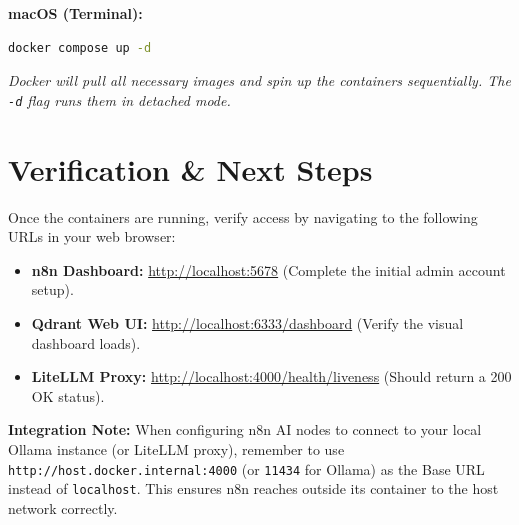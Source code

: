 \documentclass[12pt,a4paper]{article}
\begin{document}
\textbf{macOS (Terminal):}
\begin{lstlisting}[language=bash]
docker compose up -d
\end{lstlisting}
\textit{Docker will pull all necessary images and spin up the containers sequentially. The \texttt{-d} flag runs them in detached mode.}

\section{Verification \& Next Steps}
Once the containers are running, verify access by navigating to the following URLs in your web browser:
\begin{itemize}
    \item \textbf{n8n Dashboard:} \url{http://localhost:5678} (Complete the initial admin account setup).
    \item \textbf{Qdrant Web UI:} \url{http://localhost:6333/dashboard} (Verify the visual dashboard loads).
    \item \textbf{LiteLLM Proxy:} \url{http://localhost:4000/health/liveness} (Should return a 200 OK status).
\end{itemize}

\textbf{Integration Note:} When configuring n8n AI nodes to connect to your local Ollama instance (or LiteLLM proxy), remember to use \texttt{http://host.docker.internal:4000} (or \texttt{11434} for Ollama) as the Base URL instead of \texttt{localhost}. This ensures n8n reaches outside its container to the host network correctly.
\end{document}
